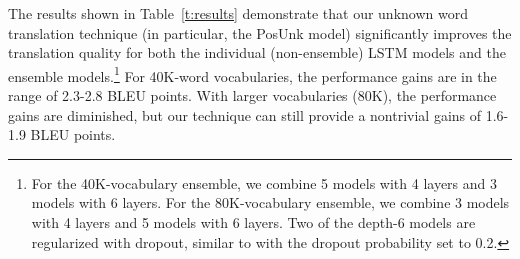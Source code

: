 The results shown in Table~\ref{t:results} demonstrate that our unknown word translation technique (in particular, the PosUnk model) significantly improves the translation quality for both the individual (non-ensemble) LSTM models and the ensemble models.\footnote{
For the 40K-vocabulary ensemble, we combine 5 models with 4 layers and 3 models with 6 layers. For the 80K-vocabulary ensemble, we combine 3 models with 4 layers and 5 models with 6 layers. Two of the depth-6 models are regularized with dropout, similar to  with the dropout probability set to 0.2.} 
For 40K-word vocabularies, the performance gains are in the range of 2.3-2.8 BLEU points. With larger vocabularies (80K), the performance gains are diminished, but our technique can still provide a nontrivial gains of 1.6-1.9 BLEU points. 

